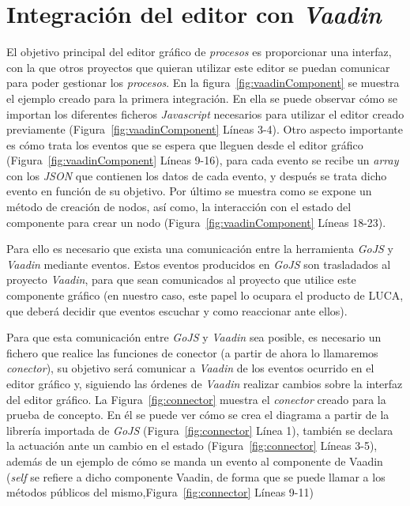 \section{Integración del editor con \emph{Vaadin}}

El objetivo principal del editor gráfico de \emph{procesos} es proporcionar una interfaz, con la que otros proyectos que quieran utilizar este editor se puedan comunicar para poder gestionar los \emph{procesos}. En la figura~\ref{fig:vaadinComponent} se muestra el ejemplo creado para la primera integración. En ella se puede observar cómo se importan los diferentes ficheros \emph{Javascript} necesarios para utilizar el editor creado previamente (Figura~\ref{fig:vaadinComponent} Líneas 3-4). Otro aspecto importante es cómo trata los eventos que se espera que lleguen desde el editor gráfico (Figura~\ref{fig:vaadinComponent} Líneas 9-16), para cada evento se recibe un \emph{array} con los \emph{JSON} que contienen los datos de cada evento, y después se trata dicho evento en función de su objetivo. Por último se muestra como se expone un método de creación de nodos, así como, la interacción con el estado del componente para crear un nodo (Figura~\ref{fig:vaadinComponent} Líneas 18-23).

Para ello es necesario que exista una comunicación entre la herramienta \emph{GoJS} y \emph{Vaadin} mediante eventos. Estos eventos producidos en \emph{GoJS} son trasladados al proyecto \emph{Vaadin}, para que sean comunicados al proyecto que utilice este componente gráfico (en nuestro caso, este papel lo ocupara el producto de LUCA, que deberá decidir que eventos escuchar y como reaccionar ante ellos).

Para que esta comunicación entre \emph{GoJS} y \emph{Vaadin} sea posible, es necesario un fichero que realice las funciones de conector (a partir de ahora lo llamaremos \emph{conector}), su objetivo será comunicar a \emph{Vaadin} de los eventos ocurrido en el editor gráfico y, siguiendo las órdenes de \emph{Vaadin} realizar cambios sobre la interfaz del editor gráfico. La Figura~\ref{fig:connector} muestra el \emph{conector} creado para la prueba de concepto. En él se puede ver cómo se crea el diagrama a partir de la librería importada de \emph{GoJS} (Figura~\ref{fig:connector} Línea 1), también se declara la actuación ante un cambio en el estado (Figura~\ref{fig:connector} Líneas 3-5), además de un ejemplo de cómo se manda un evento al componente de Vaadin (\emph{self} se refiere a dicho componente Vaadin, de forma que se puede llamar a los métodos públicos del mismo,Figura~\ref{fig:connector} Líneas 9-11)


